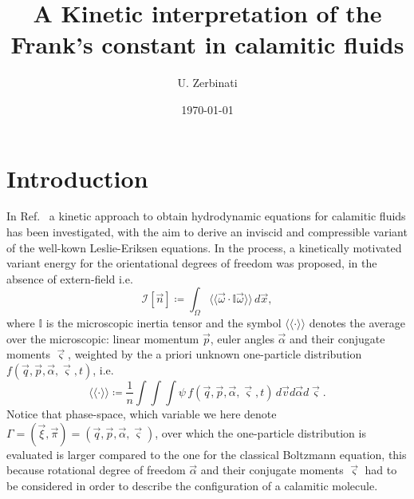 \documentclass[%
 aip,
 amsmath,amssymb,
 reprint,%
]{revtex4-1}
\newcommand{\cchevrons}[1]{\langle\!\langle #1 \rangle\!\rangle}
\begin{document}

\title[]{A Kinetic interpretation of the Frank's constant in calamitic fluids}
\author{U. Zerbinati}

\date{\today}%

\begin{abstract}
\end{abstract}

\maketitle

\section{\label{sec:intro}Introduction}
In Ref.~ a kinetic approach to obtain hydrodynamic equations for calamitic fluids has been investigated, with the aim to derive an inviscid and compressible variant of the well-kown Leslie-Eriksen equations.
In the process, a kinetically motivated variant energy for the orientational degrees of freedom was proposed, in the absence of extern-field i.e.
\begin{equation}
\label{eq:OseenFrankGen}
\mathcal{I}[\vec{n}]\coloneqq \int_{\Omega} \cchevrons{\vec{\omega} \cdot \mathbb{I}\vec{\omega}}\,d\vec{x},
\end{equation}
where $\mathbb{I}$ is the microscopic inertia tensor and the symbol $\cchevrons{\cdot}$ denotes the average over the microscopic: linear momentum $\vec{p}$, euler angles $\vec{\alpha}$ and their conjugate moments $\vec{\varsigma}$, weighted by the a priori unknown one-particle distribution $f(\vec{q},\vec{p},\vec{\alpha},\vec{\varsigma},t)$, i.e.~
\begin{equation}
	\cchevrons{\cdot} \coloneqq \frac{1}{n}\int\!\!\!\int\!\!\!\int\psi\,f({\vec{q}},\vec{p},\vec{\alpha},\vec{\varsigma},t)\,d\vec{v}d\vec{\alpha}d\vec{\varsigma}.
\end{equation}
Notice that phase-space, which variable we here denote $\Gamma=(\vec{\xi},\vec{\pi})=(\vec{q},\vec{p},\vec{\alpha},\vec{\varsigma})$, over which the one-particle distribution is evaluated is larger compared to the one for the classical Boltzmann equation, this because rotational degree of freedom $\vec{\alpha}$ and their conjugate moments $\vec{\varsigma}$ had to be considered in order to describe the configuration of a calamitic molecule.
\end{document}
